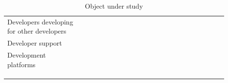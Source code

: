 \documentclass[english, 12pt, a4paper, sci, utf8, a-1b, online]{aaltothesis}
\begin{document}
{\begin{center}
\begin{longtable}{p{0.3\linewidth}p{0.6\linewidth}}
      Developers developing for other developers & \textcite{the-best-practices-for-a-great-dx} \newline \textcite{heroku-dx} \newline  \textcite{developer-experience-what-and-why} \newline \textcite{dx-devs-are-people-too} \newline \textcite{developer-experience-sanity} \newline \textcite{building-the-developer-experience-from-the-ground-up} \\
      Developer support                          & \textcite{api-developer-experience-dx-resources} \newline \textcite{contributing-as-a-designer}                                                                                                                                                                                                       \\
      Development platforms                      & \textcite{effective-developer-experience} \newline \textcite{workflows-for-the-new-developer-experience}                                                                                                                                                                                              \\
      \captionsetup{width=0.6\textwidth}                                                                                                                                                                                                                                                                                                                 \\
      \caption{Object under study}                                                                                                                                                                                                                                                                                                                       \\
      \label{table:object-under-study}                                                                                                                                                                                                                                                                                                                   \\
    \end{longtable}
  \end{center}
  \renewcommand{\arraystretch}{1}
}
\end{document}
